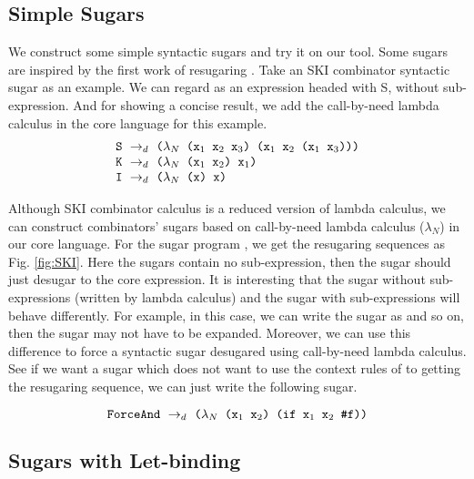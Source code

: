 \subsection{Simple Sugars}
\label{mark:simple}

We construct some simple syntactic sugars and try it on our tool. Some sugars are inspired by the first work of resugaring \cite{resugaring}.
Take an SKI combinator syntactic sugar as an example. We can regard  as an expression headed with S, without sub-expression. And for showing a concise result, we add the call-by-need lambda calculus in the core language for this example.
\[
\begin{array}{l}
\mbox{\tt S} ~\rightarrow_d~ \texttt{($\lambda_N$ ($\mbox{\tt x}_1$ $\mbox{\tt x}_2$ $\mbox{\tt x}_3$) ($\mbox{\tt x}_1$ $\mbox{\tt x}_2$ ($\mbox{\tt x}_1$ $\mbox{\tt x}_3$)))}\\
\mbox{\tt K} ~\rightarrow_d~ \texttt{($\lambda_N$ ($\mbox{\tt x}_1$ $\mbox{\tt x}_2$) $\mbox{\tt x}_1$)}\\
\mbox{\tt I} ~\rightarrow_d~ \texttt{($\lambda_N$ (x) x)}
\end{array}
\]




Although SKI combinator calculus is a reduced version of lambda calculus, we can construct combinators' sugars based on call-by-need lambda calculus ($\lambda_N$) in our core language. For the sugar program , we get the resugaring sequences as Fig.  \ref{fig:SKI}. Here the sugars contain no sub-expression, then the sugar should just desugar to the core expression. It is interesting that the sugar without sub-expressions (written by lambda calculus) and the sugar with sub-expressions will behave differently. For example, in this case, we can write the sugar as  and so on, then the sugar may not have to be expanded. Moreover, we can use this difference to force a syntactic sugar desugared using call-by-need lambda calculus. See if we want a sugar  which does not
want to use the context rules of  to getting the resugaring sequence, we can just write the following sugar.

\[
\texttt{ForceAnd} ~\rightarrow_d~ \texttt{($\lambda_N$ ($\mbox{\tt x}_1$ $\mbox{\tt x}_2$) (if $\mbox{\tt x}_1$ $\mbox{\tt x}_2$ \#f))}
\]






\subsection{Sugars with Let-binding}
\label{mark:hygienic}


